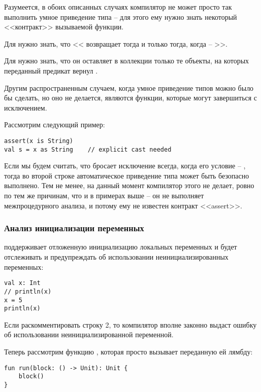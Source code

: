 Разумеется, в обоих описанных случаях компилятор не может просто так выполнить умное приведение типа -- для этого ему нужно знать некоторый <<контракт>> вызываемой функции.

Для  нужно знать, что << возвращает  тогда и только тогда, когда  -- >>.

Для  нужно знать, что он оставляет в коллекции только те объекты, на которых переданный предикат вернул .


\bigskip

Другим распространенным случаем, когда умное приведение типов можно было бы сделать, но оно не делается, являются функции, которые могут завершиться с исключением.

Рассмотрим следующий пример:

\begin{verbatim}
assert(x is String)
val s = x as String    // explicit cast needed
\end{verbatim}

Если мы будем считать, что  бросает исключение всегда, когда его условие -- , тогда во второй строке автоматическое приведение типа может быть безопасно выполнено. Тем не менее, на данный момент компилятор  этого не делает, ровно по тем же причинам, что и в примерах выше -- он не выполняет межпроцедурного анализа, и потому ему не известен контракт <<assert>>.




\subsubsection{Анализ инициализации переменных}

 поддерживает отложенную инициализацию локальных переменных и будет отслеживать и предупреждать об использовании неинициализированных переменных:

\begin{verbatim}
val x: Int
// println(x)
x = 5
println(x)
\end{verbatim}

Если раскомментировать строку 2, то компилятор вполне законно выдаст ошибку об использовании неинициализированной переменной.

Теперь рассмотрим функцию , которая просто вызывает переданную ей лямбду:
\begin{verbatim}
fun run(block: () -> Unit): Unit {
    block()
}
\end{verbatim}

